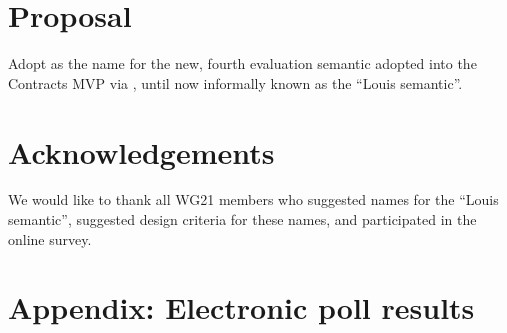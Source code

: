 
\section{Proposal}
\label{sec:proposal}

Adopt  as the name for the new, fourth evaluation semantic adopted into the Contracts MVP via \cite{P3191R0}, until now informally known as the ``Louis semantic''.


\section*{Acknowledgements}
We would like to thank all WG21 members who suggested names for the ``Louis semantic'', suggested design criteria for these names, and participated in the online survey.


\renewcommand{\bibname}{References}




\appendix
\pagebreak %
\section*{Appendix: Electronic poll results}
\label{sec:appendix}

